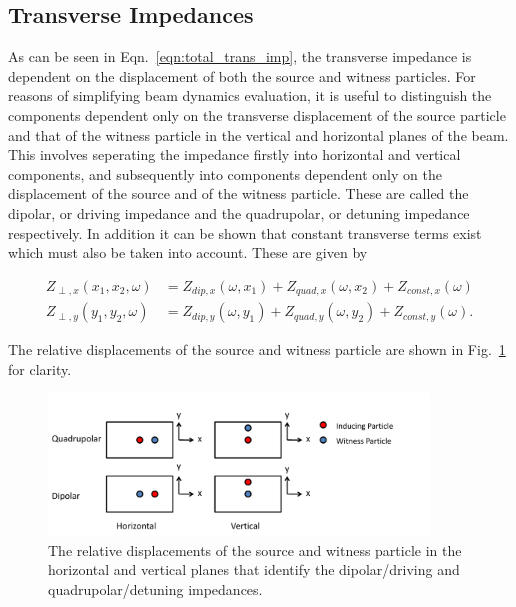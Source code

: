 \subsection{Transverse Impedances}

As can be seen in Eqn.~\ref{eqn:total_trans_imp}, the transverse impedance is dependent on the displacement of both the source and witness particles. For reasons of simplifying beam dynamics evaluation, it is useful to distinguish the components dependent only on the transverse displacement of the source particle and that of the witness particle in the vertical and horizontal planes of the beam. This involves seperating the impedance firstly into horizontal and vertical components, and subsequently into components dependent only on the displacement of the source and of the witness particle. These are called the dipolar, or driving impedance and the quadrupolar, or detuning impedance respectively. In addition it can be shown that constant transverse terms exist which must also be taken into account. These are given by

\begin{align}
Z_{\perp, x} \left( x_{1}, x_{2}, \omega \right) &= Z_{dip, x} \left( \omega, x_{1}  \right) +  Z_{quad, x} \left( \omega, x_{2}  \right) + Z_{const, x} \left( \omega  \right) \\
Z_{\perp, y} \left( y_{1}, y_{2}, \omega \right) &= Z_{dip, y} \left( \omega, y_{1}  \right) +  Z_{quad, y} \left( \omega, y_{2}  \right) + Z_{const, y} \left( \omega  \right).
\end{align}

The relative displacements of the source and witness particle are shown in Fig.~\ref{fig:trans_imp_disp} for clarity.

\begin{figure}
\begin{center}
\includegraphics[width=0.9\textwidth]{Wakefields_and_Impedances/figures/impedance-des.pdf}
\end{center}
\caption{The relative displacements of the source and witness particle in the horizontal and vertical planes that identify the dipolar/driving and quadrupolar/detuning impedances.}
\label{fig:trans_imp_disp}
\end{figure}

